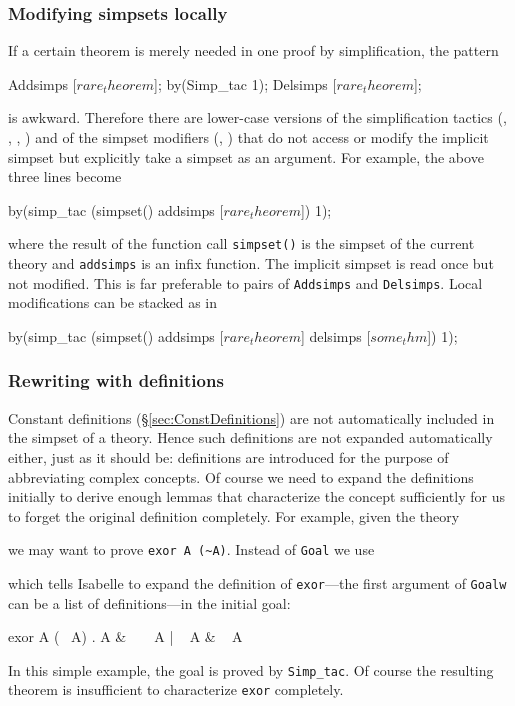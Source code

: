 \subsubsection{Modifying simpsets locally}

If a certain theorem is merely needed in one proof by simplification, the
pattern
\begin{ttbox}
Addsimps [\(rare_theorem\)];
by(Simp_tac 1);
Delsimps [\(rare_theorem\)];
\end{ttbox}
is awkward. Therefore there are lower-case versions of the simplification
tactics (, ,
, ) and of the
simpset modifiers (, )
that do not access or modify the implicit simpset but explicitly take a
simpset as an argument. For example, the above three lines become
\begin{ttbox}
by(simp_tac (simpset() addsimps [\(rare_theorem\)]) 1);
\end{ttbox}
where the result of the function call \texttt{simpset()} is the simpset of
the current theory and \texttt{addsimps} is an infix function. The implicit
simpset is read once but not modified.
This is far preferable to pairs of \texttt{Addsimps} and \texttt{Delsimps}.
Local modifications can be stacked as in
\begin{ttbox}
by(simp_tac (simpset() addsimps [\(rare_theorem\)] delsimps [\(some_thm\)]) 1);
\end{ttbox}

\subsubsection{Rewriting with definitions}

Constant definitions (\S\ref{sec:ConstDefinitions}) are not automatically
included in the simpset of a theory. Hence such definitions are not expanded
automatically either, just as it should be: definitions are introduced for
the purpose of abbreviating complex concepts. Of course we need to expand the
definitions initially to derive enough lemmas that characterize the concept
sufficiently for us to forget the original definition completely. For
example, given the theory
\begin{ttbox}
\end{ttbox}
we may want to prove \verb$exor A (~A)$. Instead of \texttt{Goal} we use
\begin{ttbox}
\end{ttbox}
which tells Isabelle to expand the definition of \texttt{exor}---the first
argument of \texttt{Goalw} can be a list of definitions---in the initial goal:
\begin{ttbox}
{\out exor A (~ A)}
{. A & ~ ~ A | ~ A & ~ A}
\end{ttbox}
In this simple example, the goal is proved by \texttt{Simp_tac}.
Of course the resulting theorem is insufficient to characterize \texttt{exor}
completely.

